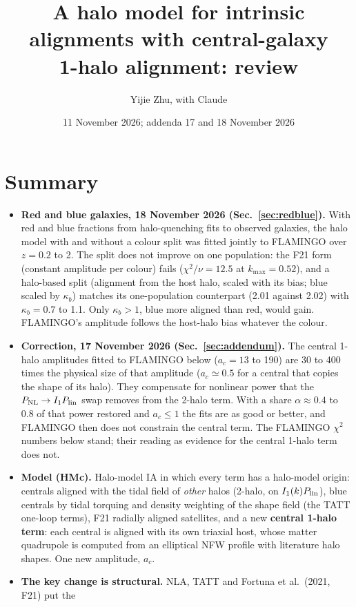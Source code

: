 \documentclass[11pt]{article}
\title{A halo model for intrinsic alignments with central-galaxy\\1-halo alignment: review}
\author{Yijie Zhu, with Claude}
\date{11 November 2026; addenda 17 and 18 November 2026}
\newcommand{\kmax}{k_{\max}}
\newcommand{\PNL}{P_{\rm NL}}
\newcommand{\Plin}{P_{\rm lin}}
\begin{document}
\maketitle

\section*{Summary}
\begin{itemize}[itemsep=3pt]
\item \textbf{Red and blue galaxies, 18 November 2026 (Sec.~\ref{sec:redblue}).}
  With red and blue fractions from halo-quenching fits to observed galaxies,
  the halo model with and without a colour split was fitted jointly to
  FLAMINGO over $z = 0.2$ to 2. The split does not improve on one
  population: the F21 form (constant amplitude per colour) fails
  ($\chi^2/\nu = 12.5$ at $\kmax = 0.52$), and a halo-based split (alignment
  from the host halo, scaled with its bias; blue scaled by $\kappa_b$) matches
  its one-population counterpart (2.01 against 2.02) with $\kappa_b = 0.7$ to
  1.1. Only $\kappa_b > 1$, blue more aligned than red, would gain. FLAMINGO's
  amplitude follows the host-halo bias whatever the colour.
\item \textbf{Correction, 17 November 2026 (Sec.~\ref{sec:addendum}).} The
  central 1-halo amplitudes fitted to FLAMINGO below ($a_c = 13$ to 190) are 30
  to 400 times the physical size of that amplitude ($a_c \simeq 0.5$ for a
  central that copies the shape of its halo). They compensate for nonlinear
  power that the $\PNL \to I_1\Plin$ swap removes from the 2-halo term. With a
  share $\alpha \approx 0.4$ to 0.8 of that power restored and $a_c \le 1$ the
  fits are as good or better, and FLAMINGO then does not constrain the central
  term. The FLAMINGO $\chi^2$ numbers below stand; their reading as evidence
  for the central 1-halo term does not.
\item \textbf{Model (HMc).} Halo-model IA in which every term has a halo-model
  origin: centrals aligned with the tidal field of \emph{other} halos (2-halo, on
  $I_1(k)\Plin$), blue centrals by tidal torquing and density weighting of the
  shape field (the TATT one-loop terms), F21 radially aligned satellites, and a
  new \textbf{central 1-halo term}: each central is aligned with its own triaxial
  host, whose matter quadrupole is computed from an elliptical NFW profile with
  literature halo shapes. One new amplitude, $a_c$.
\item \textbf{The key change is structural.} NLA, TATT and Fortuna et al.\ (2021, F21) put the

\end{itemize}
\end{document}
